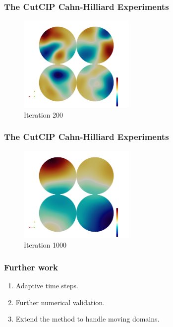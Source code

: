 \begin{frame}
\frametitle{The CutCIP Cahn-Hilliard Experiments}
\begin{figure}[h]
    \centering
    \includegraphics[width=0.5\textwidth]{CH-example/200.png}
    \caption{Iteration 200}
\end{figure}
\end{frame}

\begin{frame}
\frametitle{The CutCIP Cahn-Hilliard Experiments}
\begin{figure}[h]
    \centering
    \includegraphics[width=0.5\textwidth]{CH-example/1000.png}
    \caption{Iteration 1000}
\end{figure}
\end{frame}


\begin{frame}
\frametitle{Further work}
\begin{enumerate}
    \item Adaptive time steps.
    \item Further numerical validation.
    \item Extend the method to handle moving domains.

\end{enumerate}
\end{frame}


